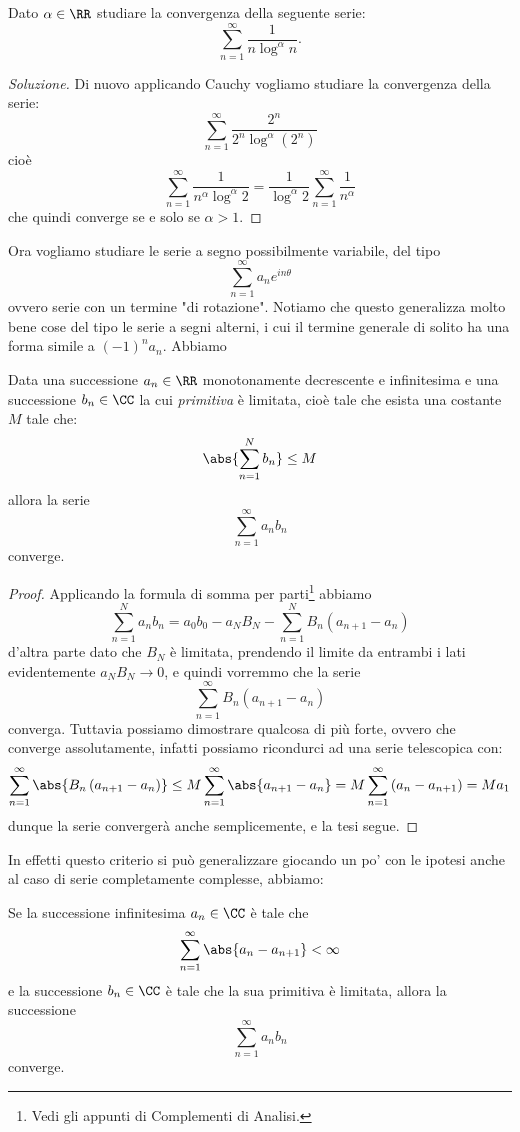 \documentclass[11pt]{scrartcl}
\begin{document}
	\begin{example}
		Dato $\alpha\in\RR$ studiare la convergenza della seguente serie:
		$$\sum_{n=1}^{\infty}\frac{1}{n \log^\alpha n}.$$
	\end{example}
	\begin{proof}[Soluzione]
		Di nuovo applicando Cauchy vogliamo studiare la convergenza della serie:
		$$\sum_{n=1}^{\infty}\frac{2^n}{2^n\log^\alpha\left(2^n\right)}$$
		cioè
		$$\sum_{n=1}^{\infty}\frac{1}{n^\alpha \log^\alpha 2}=\frac{1}{\log^\alpha 2}\sum_{n=1}^{\infty}\frac{1}{n^\alpha}$$
		che quindi converge se e solo se $\alpha>1$.
	\end{proof}
	Ora vogliamo studiare le serie a segno possibilmente variabile, del tipo
	$$\sum_{n=1}^{\infty}a_ne^{in\theta}$$
	ovvero serie con un termine "di rotazione". Notiamo che questo generalizza molto bene cose del tipo le serie a segni alterni, i cui il termine generale di solito ha una forma simile a $\left(-1\right)^na_n$. Abbiamo
	\begin{theorem}
		Data una successione $a_n\in\RR$ monotonamente decrescente e infinitesima e una successione $b_n\in\CC$ la cui \textit{primitiva} è limitata, cioè tale che esista una costante $M$ tale che:
		$$\abs{\sum_{n=1}^{N}b_n}\le M$$
		allora la serie
		$$\sum_{n=1}^{\infty}a_nb_n$$
		converge.
	\end{theorem}
	\begin{proof}
		Applicando la formula di somma per parti\footnote{Vedi gli appunti di Complementi di Analisi.} abbiamo
		$$\sum_{n=1}^{N}a_nb_n=a_0b_0-a_NB_N-\sum_{n=1}^{N}B_n\left(a_{n+1}-a_n\right)$$
		d'altra parte dato che $B_N$ è limitata, prendendo il limite da entrambi i lati evidentemente $a_NB_N\to 0$, e quindi vorremmo che la serie
		$$\sum_{n=1}^{\infty}B_n(a_{n+1}-a_n)$$
		converga. Tuttavia possiamo dimostrare qualcosa di più forte, ovvero che converge assolutamente, infatti possiamo ricondurci ad una serie telescopica con:
		$$\sum_{n=1}^{\infty}\abs{B_n\left(a_{n+1}-a_n\right)}\le M\sum_{n=1}^{\infty}\abs{a_{n+1}-a_n}=M\sum_{n=1}^{\infty}\left(a_n-a_{n+1}\right)=Ma_1$$
		dunque la serie convergerà anche semplicemente, e la tesi segue.
	\end{proof}
	In effetti questo criterio si può generalizzare giocando un po' con le ipotesi anche al caso di serie completamente complesse, abbiamo:
	\begin{theorem}
		Se la successione infinitesima $a_n\in\CC$ è tale che 
		$$\sum_{n=1}^{\infty}\abs{a_n-a_{n+1}}<\infty$$
		e la successione $b_n\in\CC$ è tale che la sua primitiva è limitata, allora la successione 
		$$\sum_{n=1}^{\infty}a_nb_n$$
		converge.
	\end{theorem}
\end{document}
